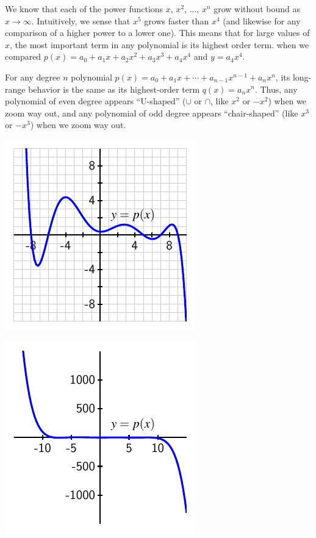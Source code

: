 \documentclass{ximera}
\begin{document}
We know that each of the power functions $x$, $x^2$, $\ldots$, $x^n$ grow without bound as $x \to \infty$.  Intuitively, we sense that $x^5$ grows faster than $x^4$ (and likewise for any comparison of a higher power to a lower one).  This means that for large values of $x$, the most important term in any polynomial is its highest order term. when we compared $p(x) = a_0 + a_1 x + a_2 x^2 + a_3 x^3 + a_4 x^4$ and $y = a_4 x^4$.%


For any degree $n$ polynomial $p(x) = a_0 + a_1 x + \cdots + a_{n-1}x^{n-1} + a_n x^n$, its long-range behavior is the same as its highest-order term $q(x) = a_n x^n$.  Thus, any polynomial of even degree appears ``U-shaped'' ($\cup$ or $\cap$, like $x^2$ or $-x^2$) when we zoom way out, and any polynomial of odd degree appears ``chair-shaped'' (like $x^3$ or $-x^3$) when we zoom way out.%

\begin{image}
\includegraphics{poly-degree-7-near}
\end{image}

\begin{image}
\includegraphics{poly-degree-7-far}
\end{image}
\end{document}
